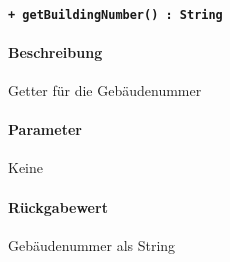 \paragraph{\texttt{+ getBuildingNumber() : String}}%
\paragraph*{Beschreibung}
Getter für die Gebäudenummer
\paragraph*{Parameter}
Keine
\paragraph*{Rückgabewert}
Gebäudenummer als String